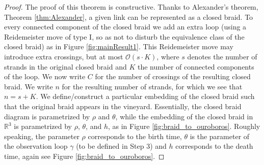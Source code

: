 \documentclass[twoside,leqno]{article}
\begin{document}
\begin{proof} %
%
The proof of this theorem is constructive. Thanks to Alexander's theorem, Theorem \ref{thm:Alexander}, a given link can be represented as a closed braid. {To every connected component of the closed braid we add an extra loop (using a Reidemeister move of type I, so as not to disturb the equivalence class of the closed braid) as in Figure \ref{fig:mainResult1}.} This Reidemeister move may introduce extra crossings, but at most $\mathcal{O} (s\cdot K)$, where $s$ denotes the number of strands in the original closed braid and $K$ the number of connected components of the loop. We now write $C$ for the number of crossings of the resulting closed braid. We write $n$ for the resulting number of strands, for which we see that $n = s+K$. 
We define/construct a particular embedding of the closed braid such that the original braid appears in the vineyard. 
Essentially, the closed braid diagram is parametrized by $\rho$ and $\theta$, while the embedding of the closed braid in $\mathbb{R}^3$ is parametrized by $\rho$, $\theta$, and $h$, as in Figure \ref{fig:braid_to_ouroboros}.
%
Roughly speaking, the parameter $\rho$ corresponds to the birth time, $\theta$ is the parameter of the observation loop $\gamma$ (to be defined in Step 3) and $h$ corresponds to the death time, again see Figure \ref{fig:braid_to_ouroboros}. 



\end{proof}
\end{document}
